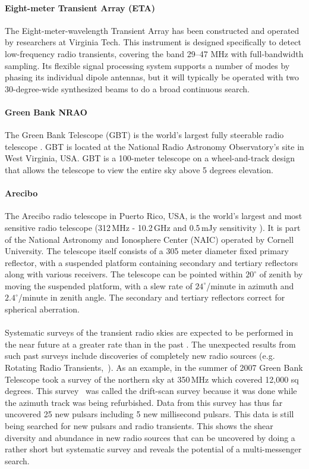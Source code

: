 \documentclass[epsf]{article}
\begin{document}
\paragraph{Eight-meter Transient Array (ETA)} 
The Eight-meter-wavelength Transient Array \cite{Patterson:2008ie} has been
constructed and operated by researchers at Virginia Tech.  This
instrument is designed specifically to detect low-frequency radio
transients, covering the band 29--47 MHz with full-bandwidth sampling.  Its
flexible signal processing system supports a number of modes by phasing
its individual dipole antennas, but it will typically be operated with
two 30-degree-wide synthesized beams to do a broad continuous search.

\paragraph{Green Bank NRAO} 
The Green Bank Telescope (GBT) is the world's largest fully steerable
radio telescope \cite{Mason:2009dq}. GBT is located at the National Radio Astronomy
Observatory's site in West Virginia, USA. GBT is a 100-meter telescope
on a wheel-and-track design that allows the telescope to view the entire
sky above 5 degrees elevation.  

\paragraph{Arecibo}
The Arecibo radio telescope in Puerto Rico, USA, is the world's largest
and most sensitive radio telescope (312\,MHz - 10.2\,GHz and 0.5\,mJy
sensitivity \cite{Lommen:2000yt}).  It is part of the National Astronomy and Ionosphere
Center (NAIC) operated by Cornell University.  The telescope itself
consists of a 305 meter diameter fixed primary reflector, with a
suspended platform containing secondary and tertiary reflectors along
with various receivers.  The telescope can be pointed within $20^\circ$
of zenith by moving the suspended platform, with a slew rate of
$24^\circ$/minute in azimuth and $2.4^\circ$/minute in zenith angle.
The secondary and tertiary reflectors correct for spherical aberration.


\paragraph{}
Systematic surveys of the transient radio skies are expected to be performed in the near future at a greater rate than in the past \cite{Lazio:2009xe}. The unexpected results from such past surveys include discoveries of completely new radio sources (e.g. Rotating Radio Transients,~\cite{BurkeSpolaor:2009rm}). 
As an example, in the summer of 2007 Green Bank Telescope took a survey of the
northern sky at 350\,MHz which covered 12,000 sq degrees. This survey~\cite{Hessels:2007ct} was
called the drift-scan survey because it was done while the azimuth track
was being refurbished. Data from this survey has thus far uncovered 25
new pulsars including 5 new millisecond pulsars.  This data is still
being searched for new pulsars and radio transients. This shows the
shear diversity and abundance in new radio sources that can be uncovered
by doing a rather short but systematic survey and reveals the potential
of a multi-messenger search. 
\end{document}
